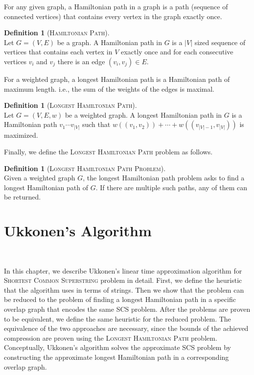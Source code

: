 \documentclass[english,twoside,censored,csm,algorithms-track-2020]{HYthesisML}
\theoremstyle{plain}
\theoremstyle{definition}
\newtheorem{definition}[theorem]{Definition}
\begin{document}
For any given graph, a Hamiltonian path in a graph is a path (sequence of connected vertices)
that contains every vertex in the graph exactly once.

\begin{definition}[\textsc{Hamiltonian Path}]~\label{def-hampath}\\
  Let $G=(V,E)$ be a graph. A Hamiltonian path in $G$ is a $|V|$ sized sequence of vertices
  that contains each vertex in $V$ exactly once and for each consecutive vertices $v_i$ and
  $v_j$ there is an edge $(v_i,v_j)\in E$.
\end{definition}

For a weighted graph, a longest Hamiltonian path is a Hamiltonian path of maximum length.
i.e., the sum of the weights of the edges is maximal.

\begin{definition}[\textsc{Longest Hamiltonian Path}]~\label{def-longest-hampath}\\
  Let $G=(V,E,w)$ be a weighted graph. A longest Hamiltonian path in $G$ is a Hamiltonian
  path $v_1\cdots v_{|V|}$ such that $w((v_1,v_2))+\cdots +w((v_{|V|-1},v_{|V|}))$ is maximized.
\end{definition}

Finally, we define the \textsc{Longest Hamiltonian Path} problem as follows.

\begin{definition}[\textsc{Longest Hamiltonian Path Problem}]~\label{def-longest-hampat-problem}\\
  Given a weighted graph $G$, the longest Hamiltonian path problem asks to find a
  longest Hamiltonian path of $G$. If there are multiple such paths, any of them can
  be returned.
\end{definition}

\chapter{Ukkonen's Algorithm}~\label{chp-ukkonen}

In this chapter, we describe Ukkonen's linear time approximation algorithm \citep{Ukkonen90} for
\textsc{Shortest Common Superstring} problem in detail. First, we define the heuristic that the
algorithm uses in terms of strings. Then we show that the problem can be reduced to the problem
of finding a longest Hamiltonian path in a specific overlap graph that encodes the same SCS problem.
After the problems are proven to be equivalent, we define the same heuristic for the reduced problem.
The equivalence of the two approaches are necessary, since the bounds of the achieved compression
are proven using the \textsc{Longest Hamiltonian Path} problem. Conceptually, Ukkonen's algorithm 
solves the approximate SCS problem by constructing the approximate longest Hamiltonian path in a corresponding
overlap graph.
\end{document}
